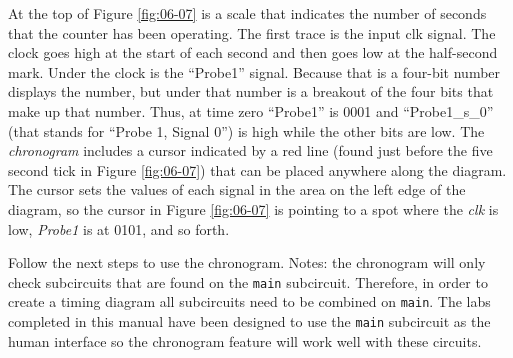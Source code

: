 At the top of Figure \ref{fig:06-07} is a scale that indicates the number of seconds that the counter has been operating. The first trace is the input clk signal. The clock goes high at the start of each second and then goes low at the half-second mark. Under the clock is the ``Probe1'' signal. Because that is a four-bit number \LE displays the number, but under that number is a breakout of the four bits that make up that number. Thus, at time zero ``Probe1'' is 0001 and ``Probe1\_s\_0'' (that stands for ``Probe 1, Signal 0'') is high while the other bits are low. The \LE \textit{chronogram} includes a cursor indicated by a red line (found just before the five second tick in Figure \ref{fig:06-07}) that can be placed anywhere along the diagram. The cursor sets the values of each signal in the area on the left edge of the diagram, so the cursor in Figure \ref{fig:06-07} is pointing to a spot where the \textit{clk} is low, \textit{Probe1} is at 0101, and so forth.

Follow the next steps to use the chronogram. Notes: the chronogram will only check subcircuits that are found on the  \lstinline[columns=fixed]|main| subcircuit. Therefore, in order to create a timing diagram all subcircuits need to be combined on \lstinline[columns=fixed]|main|. The labs completed in this manual have been designed to use the \lstinline[columns=fixed]|main| subcircuit as the human interface so the chronogram feature will work well with these circuits. 


